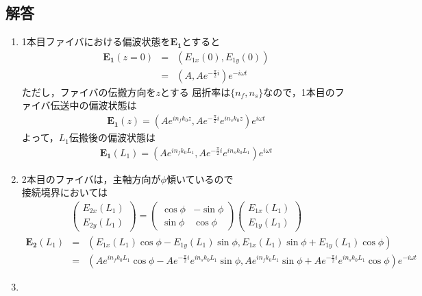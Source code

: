 \subsection*{解答}
\begin{enumerate}
    \renewcommand{\labelenumi}{(\alph{enumi})}
    \item
    1本目ファイバにおける偏波状態を$\bm{E_1}$とすると
    \begin{eqnarray*}
        \bm{E_1}(z=0)&=&(E_{1x}(0), E_{1y}(0))\\
        &=&(A, Ae^{-\frac{\pi}{2}i})e^{-i\omega t}
    \end{eqnarray*}
    ただし，ファイバの伝搬方向を$z$とする
    屈折率は$\{n_f, n_s\}$なので，1本目のファイバ伝送中の偏波状態は
    \begin{eqnarray*}
        \bm{E_1}(z)=(Ae^{in_fk_0z}, Ae^{-\frac{\pi}{2}i}e^{in_sk_0z})e^{i\omega t}
    \end{eqnarray*}
    よって，$L_1$伝搬後の偏波状態は
    \begin{eqnarray*}
        \bm{E_1}(L_1)=(Ae^{in_fk_0L_1}, Ae^{-\frac{\pi}{2}i}e^{in_sk_0L_1})e^{i\omega t}
    \end{eqnarray*}
    \item
    2本目のファイバは，主軸方向が$\phi$傾いているので\\
    接続境界においては
    \begin{eqnarray*}
        \left(\begin{array}{cc}E_{2x}(L_1)\\E_{2y}(L_1)\end{array}\right)=\left(\begin{array}{cc}\cos{\phi}&-\sin{\phi}\\\sin{\phi}&\cos{\phi}\end{array}\right)\left(\begin{array}{cc}E_{1x}(L_1)\\E_{1y}(L_1)\end{array}\right)
    \end{eqnarray*}
    \begin{eqnarray*}
        \bm{E_2}(L_1)&=&(E_{1x}(L_1)\cos{\phi}-E_{1y}(L_1)\sin{\phi}, E_{1x}(L_1)\sin{\phi}+E_{1y}(L_1)\cos{\phi})\\
        &=&(Ae^{in_fk_0L_1}\cos{\phi}-Ae^{-\frac{\pi}{2}i}e^{in_sk_0L_1}\sin{\phi}, Ae^{in_fk_0L_1}\sin{\phi}+Ae^{-\frac{\pi}{2}i}e^{in_sk_0L_1}\cos{\phi})e^{-i\omega t}        
    \end{eqnarray*}
    \item
    \begin{eqnarray*}

\end{eqnarray*}
\end{enumerate}
